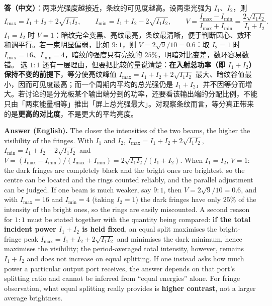\documentclass[11pt]{ctexart}
\begin{document}

\textbf{答（中文）}：两束光强度越接近，条纹的可见度越高。设两束光强为 $I_1$、$I_2$，则
\[
  I_{\max}=I_1+I_2+2\sqrt{I_1I_2},\qquad
  I_{\min}=I_1+I_2-2\sqrt{I_1I_2},\qquad
  V=\frac{I_{\max}-I_{\min}}{I_{\max}+I_{\min}}=\frac{2\sqrt{I_1I_2}}{I_1+I_2}.
\]
$I_1=I_2$ 时 $V=1$：暗纹完全变黑、亮纹最亮，条纹最清晰，便于判断圆心、数环和调平行。若一束明显偏弱，比如 $9:1$，则 $V=2\sqrt{9}/10=0.6$：取 $I_2=1$ 时 $I_{\max}=16$、$I_{\min}=4$，暗纹的强度只有亮纹的 $25\%$，明暗对比变差，数环容易数错。
选 $1:1$ 还有一层理由，但要把比较的量说清楚：\textbf{在入射总功率（即 $I_1+I_2$）保持不变的前提下}，等分使亮纹峰值 $I_{\max}=I_1+I_2+2\sqrt{I_1I_2}$ 最大、暗纹谷值最小，因而可见度最高；而一个周期内平均的总光强仍是 $I_1+I_2$，并不因等分而增大。若讨论的是分光板某个输出端分到的功率，还要看该输出端的分配比例，不能只由「两束能量相等」推出「屏上总光强最大」。对观察条纹而言，等分真正带来的是\textbf{更高的对比度}，不是更大的平均亮度。

\textbf{Answer (English).} The closer the intensities of the two beams, the higher the visibility of the fringes. With $I_1$ and $I_2$,
$I_{\max}=I_1+I_2+2\sqrt{I_1I_2}$, $I_{\min}=I_1+I_2-2\sqrt{I_1I_2}$ and
$V=(I_{\max}-I_{\min})/(I_{\max}+I_{\min})=2\sqrt{I_1I_2}/(I_1+I_2)$.
When $I_1=I_2$, $V=1$: the dark fringes are completely black and the bright ones are brightest, so the centre can be located and the rings counted reliably, and the parallel adjustment can be judged. If one beam is much weaker, say $9:1$, then $V=2\sqrt{9}/10=0.6$, and with $I_{\max}=16$ and $I_{\min}=4$ (taking $I_2=1$) the dark fringes have only $25\%$ of the intensity of the bright ones, so the rings are easily miscounted. A second reason for $1:1$ must be stated together with the quantity being compared: \textbf{if the total incident power $I_1+I_2$ is held fixed}, an equal split maximises the bright-fringe peak $I_{\max}=I_1+I_2+2\sqrt{I_1I_2}$ and minimises the dark minimum, hence maximises the visibility; the period-averaged total intensity, however, remains $I_1+I_2$ and does not increase on equal splitting. If one instead asks how much power a particular output port receives, the answer depends on that port's splitting ratio and cannot be inferred from ``equal energies'' alone. For fringe observation, what equal splitting really provides is \textbf{higher contrast}, not a larger average brightness.
\end{document}
